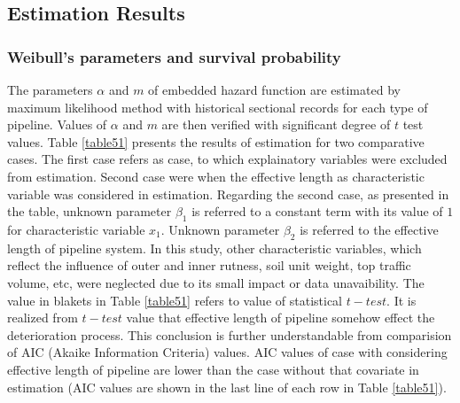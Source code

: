 \documentclass[a4paper,oneside,onecolumn,preprint,10pt,authoryear]{elsarticle}
\begin{document}
\subsection{Estimation Results}
\label{582}
\subsubsection{Weibull's parameters and survival probability}
\label{5821}
The parameters $\alpha$ and $m$ of embedded hazard function are estimated by maximum likelihood method with historical sectional records for each type of pipeline. Values of $\alpha$ and $m$ are then verified with significant degree of $t$ test values. Table \ref{table51} presents the results of estimation for two comparative cases. The first case refers as case, to which explainatory variables were excluded from estimation. Second case were when the effective length as characteristic variable was considered in estimation. Regarding the second case, as presented in the table, unknown parameter $\beta_1$ is referred to a constant term with its value of $1$ for characteristic variable $x_1$. Unknown parameter $\beta_2$ is referred to the effective length of pipeline system. In this study, other characteristic variables, which reflect the influence of outer and inner rutness, soil unit weight, top traffic volume, etc, were neglected due to its small impact or data unavaibility. The value in blakets in Table \ref{table51} refers to value of statistical $t-test$. It is realized from $t-test$ value that effective length of pipeline somehow effect the deterioration process. This conclusion is further understandable from comparision of AIC (Akaike Information Criteria) \cite{akaike} values. AIC values of case with considering effective length of pipeline are lower than the case without that covariate in estimation (AIC values are shown in the last line of each row in Table \ref{table51}).
%
\end{document}
